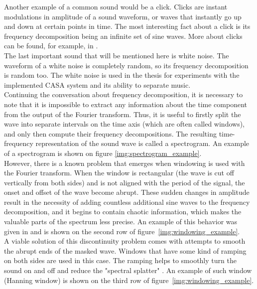 Another example of a common sound would be a click. Clicks are instant modulations in amplitude of a sound waveform, or waves that instantly go up and down at certain points in time. The most interesting fact about a click is its frequency decomposition being an infinite set of sine waves. More about clicks can be found, for example, in \cite{Schnupp2011}.\\

The last important sound that will be mentioned here is white noise. The waveform of a white noise is completely random, so its frequency decomposition is random too. The white noise is used in the thesis for experiments with the implemented CASA system and its ability to separate music.\\

Continuing the conversation about frequency decomposition, it is necessary to note that it is impossible to extract any information about the time component from the output of the Fourier transform. Thus, it is useful to firstly split the wave into separate intervals on the time axis (which are often called windows), and only then compute their frequency decompositions. The resulting time-frequency representation of the sound wave is called a spectrogram. An example of a spectrogram is shown on figure \ref{img:spectrogram_example}.\\

However, there is a known problem that emerges when windowing is used with the Fourier transform. When the window is rectangular (the wave is cut off vertically from both sides) and is not aligned with the period of the signal, the onset and offset of the wave become abrupt. These sudden changes in amplitude result in the necessity of adding countless additional sine waves to the frequency decomposition, and it begins to contain chaotic information, which makes the valuable parts of the spectrum less precise. An example of this behavior was given in \cite{Schnupp2011} and is shown on the second row of figure~\ref{img:windowing_example}.\\

A viable solution of this discontinuity problem comes with attempts to smooth the abrupt ends of the masked wave. Windows that have some kind of ramping on both sides are used in this case. The ramping helps to smoothly turn the sound on and off and reduce the "spectral splatter" \cite{Schnupp2011}. An example of such window (Hanning window) is shown on the third row of fi\-gure~\ref{img:windowing_example}.\\

